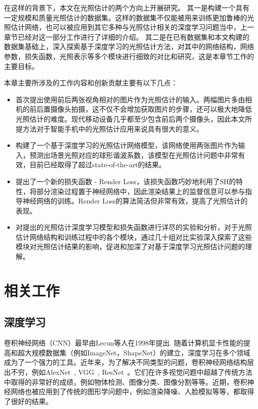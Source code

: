 在这样的背景下，本文在光照估计的两个方向上开展研究。
其一是构建一个具有一定规模和质量光照估计的数据集。这样的数据集不仅能被用来训练更加鲁棒的光照估计网络，也可以被应用到其它多种与光照估计相关的深度学习问题当中，上一章节已经对这一部分工作进行了详细的介绍。
其二是在已有数据集和本文构建的数据集基础上，深入探索基于深度学习的光照估计方法，对其中的网络结构，网络参数，损失函数，光照表示等多个模块进行细致的对比和研究，这是本章节工作的主要目标。

本章主要所涉及的工作内容和创新贡献主要有以下几点：
\begin{itemize}
    \item 首次提出使用前后两张视角相对的图片作为光照估计的输入。两幅图片多由相机的前后置摄像头拍摄，这不仅不会增加获取图片的步骤，还可以极大地降低光照估计的难度。现代移动设备几乎都至少包含前后两个摄像头，因此本文所提方法对于智能手机中的光照估计应用来说具有很大的意义。
    \item 构建了一个基于深度学习的光照估计网络模型，该网络使用两张图片作为输入，预测出场景光照对应的球形谐波系数，该模型在光照估计问题中非常有效，目前已经取得了超过state-of-the-art的结果。
    \item 提出了一个新的损失函数 - Render Loss，该损失函数巧妙地利用了SH的特性，将部分渲染过程置于神经网络中，因此渲染结果上的监督信息可以参与指导神经网络的训练。Render Loss的算法简洁但非常有效，提高了光照估计的表现。
    \item 对提出的光照估计深度学习模型和损失函数进行详尽的实验和分析，对于光照估计网络结构和训练过程中的各个模块，通过几十组对比实验深入探索了这些模块对光照估计结果的影响，促进和加深了对基于深度学习光照估计问题的理解。
\end{itemize}

\section{相关工作}
\subsection{深度学习}
卷积神经网络（CNN）最早由Lecun等人\cite{lecun1998gradient}在1998年提出. 随着计算机显卡性能的提高和超大规模数据集（例如ImageNet\cite{deng2009imagenet}，ShapeNet\cite{chang2015shapenet}）的建立，深度学习在多个领域成为了一个强力的工具。近年来，为了解决不同类型的问题，卷积神经网络结构层出不穷，例如AlexNet~\cite{krizhevsky2012imagenet}, VGG~\cite{simonyan2014very}, ResNet~\cite{he2016deep}。它们在许多视觉问题中超越了传统方法中取得的非常好的成绩，例如物体检测\cite{girshick2014rich}、图像分类\cite{krizhevsky2012imagenet}、图像分割\cite{ronneberger2015u}等等。近期，卷积神经网络也被应用到了传统的图形学问题中，例如渲染降噪\cite{chaitanya2017interactive}、人脸模拟\cite{karras2017audio}等等，都取得了很好的结果。
